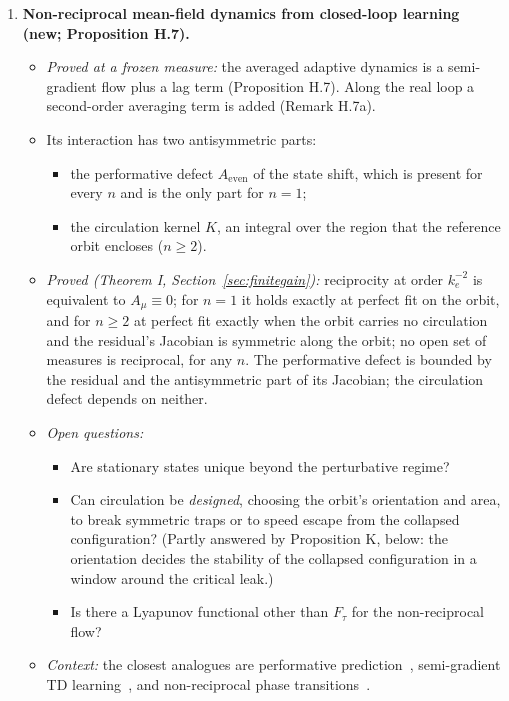 \begin{enumerate}[label=\arabic*.,leftmargin=*]
\item \textbf{Non-reciprocal mean-field dynamics from closed-loop learning (new; Proposition H.7).}
  \begin{itemize}
    \item \emph{Proved at a frozen measure:} the averaged adaptive dynamics is a semi-gradient flow plus a lag term
      (Proposition H.7). Along the real loop a second-order averaging term is added (Remark H.7a).
    \item Its interaction has two antisymmetric parts:
      \begin{itemize}
        \item the performative defect $A_{\mathrm{even}}$ of the state shift, which is present for every $n$ and is
          the only part for $n=1$;
        \item the circulation kernel $K$, an integral over the region that the reference orbit encloses ($n\ge2$).
      \end{itemize}
    \item \emph{Proved (Theorem I, Section~\ref{sec:finitegain}):} reciprocity at order $k_e^{-2}$ is equivalent to
      $A_\mu\equiv0$; for $n=1$ it holds exactly at perfect fit on the orbit, and for $n\ge2$ at perfect fit exactly
      when the orbit carries no circulation and the residual's Jacobian is symmetric along the orbit; no open set of
      measures is reciprocal, for any $n$. The performative defect is bounded by the residual and the antisymmetric
      part of its Jacobian; the circulation defect depends on neither.
    \item \emph{Open questions:}
      \begin{itemize}
        \item Are stationary states unique beyond the perturbative regime?
        \item Can circulation be \emph{designed}, choosing the orbit's orientation and area, to break symmetric traps
          or to speed escape from the collapsed configuration? (Partly answered by Proposition K, below: the
          orientation decides the stability of the collapsed configuration in a window around the critical leak.)
        \item Is there a Lyapunov functional other than $F_\tau$ for the non-reciprocal flow?
      \end{itemize}
    \item \emph{Context:} the closest analogues are performative prediction~\cite{S14}, semi-gradient TD
      learning~\cite{S10}, \cite{S11} and non-reciprocal phase transitions~\cite{S12}.

\end{itemize}
\end{enumerate}

